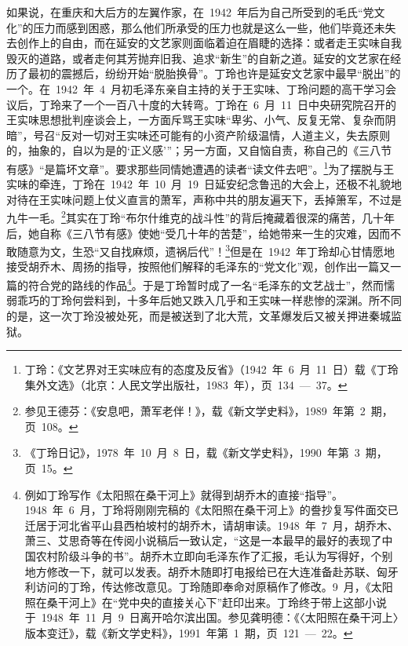 如果说，在重庆和大后方的左翼作家，在~1942~年后为自己所受到的毛氏“党文化”的压力而感到困惑，那么他们所承受的压力也就是这么一些，他们毕竟还未失去创作上的自由，而在延安的文艺家则面临着迫在眉睫的选择：或者走王实味自我毁灭的道路，或者走何其芳抛弃旧我、追求“新生”的自新之道。延安的文艺家在经历了最初的震撼后，纷纷开始“脱胎换骨”。丁玲也许是延安文艺家中最早“脱出”的一个。在~1942~年~4~月初毛泽东亲自主持的关于王实味、丁玲问题的高干学习会议后，丁玲来了一个一百八十度的大转弯。丁玲在~6~月~11~日中央研究院召开的王实味思想批判座谈会上，一方面斥骂王实味“卑劣、小气、反复无常、复杂而阴暗”，号召“反对一切对王实味还可能有的小资产阶级温情，人道主义，失去原则的，抽象的，自以为是的‘正义感’”；另一方面，又自恼自责，称自己的《三八节有感》“是篇坏文章”。要求那些同情她遭遇的读者“读文件去吧”。\footnote{丁玲：《文艺界对王实味应有的态度及反省》（1942~年~6~月~11~日）载《丁玲集外文选》（北京：人民文学出版社，1983~年），页~134~—~37。}为了摆脱与王实味的牵连，丁玲在~1942~年~10~月~19~日延安纪念鲁迅的大会上，还极不礼貌地对待在王实味问题上仗义直言的萧军，声称中共的朋友遍天下，丢掉箫军，不过是九牛一毛。\footnote{参见王德芬：《安息吧，萧军老伴！》，载《新文学史料》，1989~年第~2~期，页~108。}其实在丁玲“布尔什维克的战斗性”的背后掩藏着很深的痛苦，几十年后，她自称《三八节有感》使她“受几十年的苦楚”，给她带来一生的灾难，因而不敢随意为文，生恐“又自找麻烦，遗祸后代”！\footnote{《丁玲日记》，1978~年~10~月~8~日，载《新文学史料》，1990~年第~3~期，页~15。}但是在~1942~年丁玲却心甘情愿地接受胡乔木、周扬的指导，按照他们解释的毛泽东的“党文化”观，创作出一篇又一篇的符合党的路线的作品\footnote{例如丁玲写作《太阳照在桑干河上》就得到胡乔木的直接“指导”。1948~年~6~月，丁玲将刚刚完稿的《太阳照在桑干河上》的誊抄复写件面交已迁居于河北省平山县西柏坡村的胡乔木，请胡审读。1948~年~7~月，胡乔木、萧三、艾思奇等在传阅小说稿后一致认定，“这是一本最早的最好的表现了中国农村阶级斗争的书”。胡乔木立即向毛泽东作了汇报，毛认为写得好，个别地方修改一下，就可以发表。胡乔木随即打电报给已在大连准备赴苏联、匈牙利访问的丁玲，传达修改意见。丁玲随即奉命对原稿作了修改。9~月，《太阳照在桑干河上》在“党中央的直接关心下”赶印出来。丁玲终于带上这部小说于~1948~年~11~月~9~日离开哈尔滨出国。参见龚明德：《〈太阳照在桑干河上〉版本变迁》，载《新文学史料》，1991~年第~1~期，页~121~—~22。}。于是丁玲暂时成了一名“毛泽东的文艺战士”，然而懦弱乖巧的丁玲何尝料到，十多年后她又跌入几乎和王实味一样悲惨的深渊。所不同的是，这一次丁玲没被处死，而是被送到了北大荒，文革爆发后又被关押进秦城监狱。